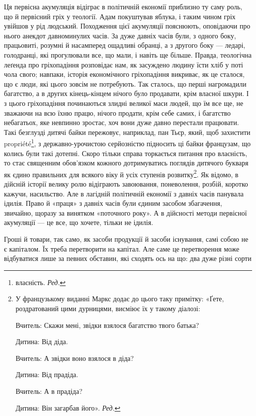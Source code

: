 Ця первісна акумуляція відіграє в політичній економії приблизно
ту саму роль, що й первісний гріх у теології. Адам покуштував
яблука, і таким чином гріх увійшов у рід людський.
Походження цієї акумуляції пояснюють, оповідаючи про нього
анекдот давноминулих часів. За дуже давніх часів були, з
одного боку, працьовиті, розумні й насамперед ощадливі обранці,
а з другого боку — ледарі, голодранці, які прогулювали все,
що мали, і навіть ще більше. Правда, теологічна леґенда про
гріхопадіння розповідає нам, як засуждено людину їсти хліб
у поті чола свого; навпаки, історія економічного гріхопадіння
викриває, як це сталося, що є люди, які цього зовсім не потребують.
Так сталось, що перші нагромадили багатство, а в
других кінець-кінцем нічого було продавати, крім власної
шкури. І з цього гріхопадіння починаються злидні великої маси
людей, що їм все ще, не зважаючи на всю їхню працю, нічого
продати, крім себе самих, і багатство небагатьох, яке невпинно
зростає, хоч вони дуже давно перестали працювати. Такі безглузді
дитячі байки пережовує, наприклад, пан Тьєр, який,
щоб захистити propriété\footnote*{
власність. \emph{Ред.}
}, з державно-урочистою серйозністю
підносить ці байки французам, що колись були такі дотепні.
Скоро тільки справа торкається питання про власність, то стає
священним обов’язком кожного дотримуватись поглядів дитячого
букваря як єдино правильних для всякого віку й усіх ступенів
розвитку\footnote*{
У французькому виданні Маркс додає до цього таку примітку:
«Ґете, роздратований цими дурницями, висміює їх у такому діалозі:

Вчитель: Скажи мені, звідки взялося багатство твого батька?

Дитина: Від діда.

Вчитель: А звідки воно взялося в діда?

Дитина: Від прадіда.

Вчитель: А в прадіда?

Дитина: Він загарбав його». \emph{Ред.}
}. Як відомо, в дійсній історії велику ролю відіграють
завоювання, поневолення, розбій, коротко кажучи, насильство.
Але в лагідній політичній економії з давніх часів панувала
ідилія. Право й «праця» з давніх часів були єдиним засобом
збагачення, звичайно, щоразу за винятком «поточного року».
А в дійсності методи первісної акумуляції — це все, що хочете,
тільки не ідилія.

Гроші й товари, так само, як засоби продукції й засоби існування,
самі собою не є капіталом. Їх треба перетворити на капітал.
Але саме це перетворення може відбуватися лише за певних
обставин, які сходять ось на що: два дуже різні сорти
\parbreak{}
